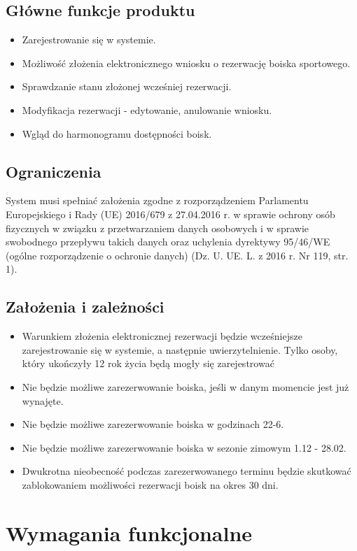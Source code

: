\documentclass[a4paper,11pt]{article}
\begin{document}
\subsection {Główne funkcje produktu}
\begin{itemize}
	\item Zarejestrowanie się w systemie.
	\item Możliwość złożenia elektronicznego wniosku o rezerwację boiska sportowego.
	\item Sprawdzanie stanu złożonej wcześniej rezerwacji.
	\item Modyfikacja rezerwacji - edytowanie, anulowanie wniosku.
	\item Wgląd do harmonogramu dostępności boisk.
\end{itemize} 

\subsection {Ograniczenia}
System musi spełniać założenia zgodne z rozporządzeniem Parlamentu Europejskiego i Rady (UE) 2016/679 z 27.04.2016 r. w sprawie ochrony osób fizycznych w związku z przetwarzaniem danych osobowych i w sprawie swobodnego przepływu takich danych oraz uchylenia dyrektywy 95/46/WE (ogólne rozporządzenie o ochronie danych) (Dz. U. UE. L. z 2016 r. Nr 119, str. 1).

\subsection {Założenia i zależności}
\begin{itemize}
	\item Warunkiem złożenia elektronicznej rezerwacji będzie 			wcześniejsze zarejestrowanie się w systemie, a następnie uwierzytelnienie. Tylko osoby, który ukończyły 12 rok życia będą mogły się zarejestrować
	\item Nie będzie możliwe zarezerwowanie boiska, jeśli w danym momencie jest już wynajęte.
	\item Nie będzie możliwe zarezerwowanie boiska w godzinach 22-6.
	\item Nie będzie możliwe zarezerwowanie boiska w sezonie zimowym 1.12 - 28.02.
	\item Dwukrotna nieobecność podczas zarezerwowanego terminu będzie skutkować zablokowaniem możliwości rezerwacji boisk na okres 30 dni.
\end{itemize}

\section {Wymagania funkcjonalne}
\end{document}
